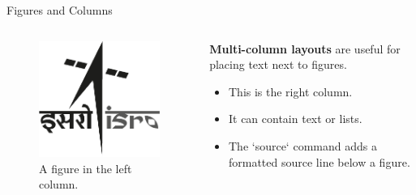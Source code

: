 \documentclass[serif]{NRSCISRO}
\begin{document}
\begin{frame}{Figures and Columns}
    \begin{columns}[T] %
        \begin{column}{0.5\textwidth}
            \begin{figure}
                \includegraphics[width=\textwidth]{images/black.png}
                \caption{A figure in the left column.}
            \end{figure}
        \end{column}
        \begin{column}{0.5\textwidth}
            \textbf{Multi-column layouts} are useful for placing text next to figures.
            \begin{itemize}
                \item This is the right column.
                \item It can contain text or lists.
                \item The `source{}` command adds a formatted source line below a figure.
            \end{itemize}
        \end{column}
    \end{columns}
\end{frame}
\end{document}
